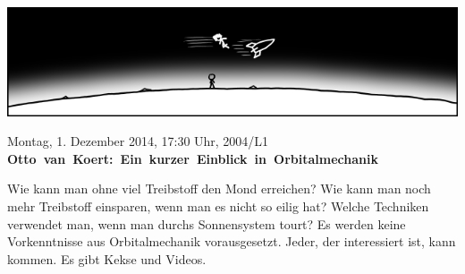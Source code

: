 \documentclass[a4paper,ngerman,landscape]{scrartcl}
\begin{document}
\begin{center}
  \Huge
  \vspace*{0.0em}
  \includegraphics[scale=1.00]{orbit-wide}
  \vspace{0.5em}

  \vspace{1em}

  Montag, 1. Dezember 2014, 17:30 Uhr, 2004/L1 \\
  \mbox{\textbf{Otto van Koert: Ein kurzer Einblick in Orbitalmechanik}}

  \Large
  \begin{minipage}{0.80\textwidth}
    \setlength\parskip{\medskipamount}
    \vspace{0.3em}
    Wie kann man ohne viel Treibstoff den Mond erreichen? Wie kann man noch
    mehr Treibstoff einsparen, wenn man es nicht so eilig hat? Welche Techniken
    verwendet man, wenn man durchs Sonnensystem tourt?
    Es werden keine Vorkenntnisse aus Orbitalmechanik vorausgesetzt. Jeder, der
    interessiert ist, kann kommen. Es gibt Kekse und Videos.
  \end{minipage}
\end{center}
\end{document}
